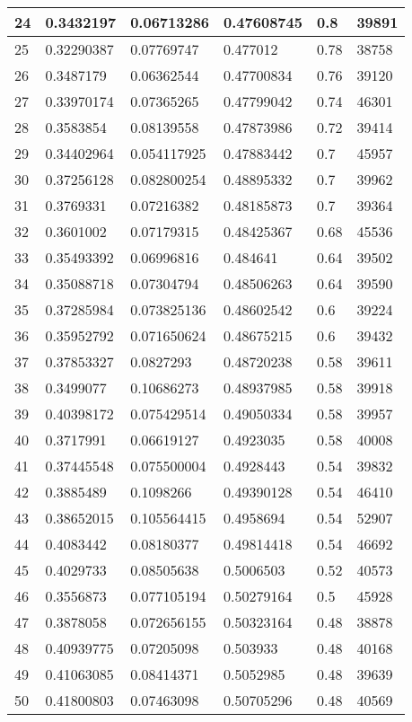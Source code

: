 \begin{longtable}{|l|l|l|l|l|l|}
24 & 0.3432197 & 0.06713286 & 0.47608745 & 0.8 & 39891 \\ \hline 
25 & 0.32290387 & 0.07769747 & 0.477012 & 0.78 & 38758 \\ \hline 
26 & 0.3487179 & 0.06362544 & 0.47700834 & 0.76 & 39120 \\ \hline 
27 & 0.33970174 & 0.07365265 & 0.47799042 & 0.74 & 46301 \\ \hline 
28 & 0.3583854 & 0.08139558 & 0.47873986 & 0.72 & 39414 \\ \hline 
29 & 0.34402964 & 0.054117925 & 0.47883442 & 0.7 & 45957 \\ \hline 
30 & 0.37256128 & 0.082800254 & 0.48895332 & 0.7 & 39962 \\ \hline 
31 & 0.3769331 & 0.07216382 & 0.48185873 & 0.7 & 39364 \\ \hline 
32 & 0.3601002 & 0.07179315 & 0.48425367 & 0.68 & 45536 \\ \hline 
33 & 0.35493392 & 0.06996816 & 0.484641 & 0.64 & 39502 \\ \hline 
34 & 0.35088718 & 0.07304794 & 0.48506263 & 0.64 & 39590 \\ \hline 
35 & 0.37285984 & 0.073825136 & 0.48602542 & 0.6 & 39224 \\ \hline 
36 & 0.35952792 & 0.071650624 & 0.48675215 & 0.6 & 39432 \\ \hline 
37 & 0.37853327 & 0.0827293 & 0.48720238 & 0.58 & 39611 \\ \hline 
38 & 0.3499077 & 0.10686273 & 0.48937985 & 0.58 & 39918 \\ \hline 
39 & 0.40398172 & 0.075429514 & 0.49050334 & 0.58 & 39957 \\ \hline 
40 & 0.3717991 & 0.06619127 & 0.4923035 & 0.58 & 40008 \\ \hline 
41 & 0.37445548 & 0.075500004 & 0.4928443 & 0.54 & 39832 \\ \hline 
42 & 0.3885489 & 0.1098266 & 0.49390128 & 0.54 & 46410 \\ \hline 
43 & 0.38652015 & 0.105564415 & 0.4958694 & 0.54 & 52907 \\ \hline 
44 & 0.4083442 & 0.08180377 & 0.49814418 & 0.54 & 46692 \\ \hline 
45 & 0.4029733 & 0.08505638 & 0.5006503 & 0.52 & 40573 \\ \hline 
46 & 0.3556873 & 0.077105194 & 0.50279164 & 0.5 & 45928 \\ \hline 
47 & 0.3878058 & 0.072656155 & 0.50323164 & 0.48 & 38878 \\ \hline 
48 & 0.40939775 & 0.07205098 & 0.503933 & 0.48 & 40168 \\ \hline 
49 & 0.41063085 & 0.08414371 & 0.5052985 & 0.48 & 39639 \\ \hline 
50 & 0.41800803 & 0.07463098 & 0.50705296 & 0.48 & 40569 \\ \hline 
\end{longtable}